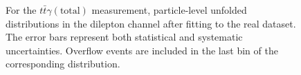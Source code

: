 \begin{figure}[ht]
  \quad\quad
  \caption{For the $t\bar{t}\gamma(\mathrm{total})$ measurement, particle-level unfolded distributions in the dilepton channel after fitting to the real dataset. 
  The error bars represent both statistical and systematic uncertainties. Overflow events are included in the last bin of the corresponding distribution.}
  \label{fig:pt_unfolded_dilep_tty_total_realdata_1}
\end{figure}

